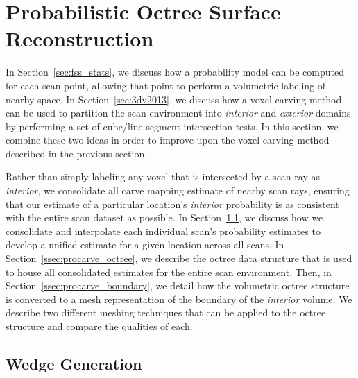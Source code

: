 \documentclass[12pt,onecolumn,oneside]{book}
\begin{document}
\section{Probabilistic Octree Surface Reconstruction}
\label{sec:procarve}

In Section~\ref{sec:fss_stats}, we discuss how a probability model can be computed for each scan point, allowing that point to perform a volumetric labeling of nearby space.  In Section~\ref{sec:3dv2013}, we discuss how a voxel carving method can be used to partition the scan environment into {\it interior} and {\it exterior} domains by performing a set of cube/line-segment intersection tests.  In this section, we combine these two ideas in order to improve upon the voxel carving method described in the previous section.

Rather than simply labeling any voxel that is intersected by a scan ray as {\it interior}, we consolidate all carve mapping estimate of nearby scan rays, ensuring that our estimate of a particular location's {\it interior} probability is as consistent with the entire scan dataset as possible.  In Section~\ref{ssec:procarve_wedge_and_chunk}, we discuss how we consolidate and interpolate each individual scan's probability estimates to develop a unified estimate for a given location across all scans.  In Section~\ref{ssec:procarve_octree}, we describe the octree data structure that is used to house all consolidated estimates for the entire scan environment.  Then, in Section~\ref{ssec:procarve_boundary}, we detail how the volumetric octree structure is converted to a mesh representation of the boundary of the {\it interior} volume.  We describe two different meshing techniques that can be applied to the octree structure and compare the qualities of each.

\subsection{Wedge Generation}
\label{ssec:procarve_wedge_and_chunk}
\end{document}
